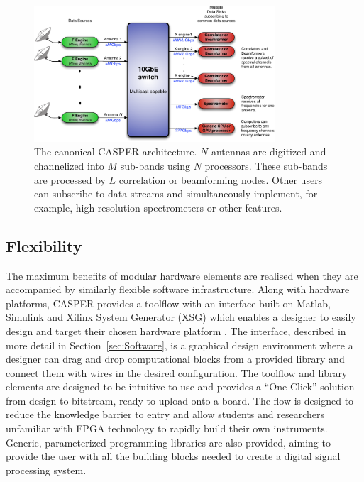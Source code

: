 \documentclass{ws-jai}
\begin{document}
\begin{figure}[htb]
 \centering
 \includegraphics[width=0.8\textwidth]{./figures/ethernet-instrument.pdf}
 \caption{The canonical CASPER architecture. $N$ antennas are digitized and channelized into $M$ sub-bands using $N$ processors. These sub-bands are processed by $L$ correlation or beamforming nodes. Other users can subscribe to data streams and simultaneously implement, for example, high-resolution spectrometers or other features.}
 \label{fig:ethernet-instrument}
\end{figure}



\subsection{Flexibility}

The maximum benefits of modular hardware elements are realised when they are accompanied by similarly flexible software infrastructure. Along with hardware platforms, CASPER provides a toolflow with an interface built on Matlab, Simulink and Xilinx System Generator (XSG) which enables a designer to easily
design and target their chosen hardware platform \citep{pars05}. The interface, described in more detail in Section~\ref{sec:Software}, 
is a graphical design environment where a designer can drag and
drop computational blocks from a provided library and connect them with wires in the desired configuration.
The toolflow and library elements are designed to be intuitive to use and provides a ``One-Click'' solution from design to
bitstream, ready to upload onto a board. The flow is designed to reduce the knowledge barrier to entry and allow students and researchers unfamiliar with FPGA technology to rapidly build their own instruments.
Generic, parameterized programming libraries are also provided, aiming to provide the user with all the building blocks needed to create a digital signal processing system.
\end{document}
